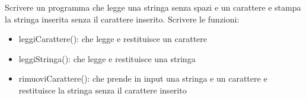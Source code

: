 \begin{Exercise}[label={ex:rimuovi}]
    Scrivere un programma che legge una stringa senza spazi e un carattere e stampa la stringa inserita senza il carattere inserito.
    Scrivere le funzioni:
    \begin{itemize}
        \item leggiCarattere(): che legge e restituisce un carattere
        \item leggiStringa(): che legge e restituisce una stringa
        \item rimuoviCarattere(): che prende in input una stringa e un carattere e restituisce la stringa senza il carattere inserito
    \end{itemize}
\end{Exercise}

\begin{Answer}[ref={ex:rimuovi}]
  	
\end{Answer}